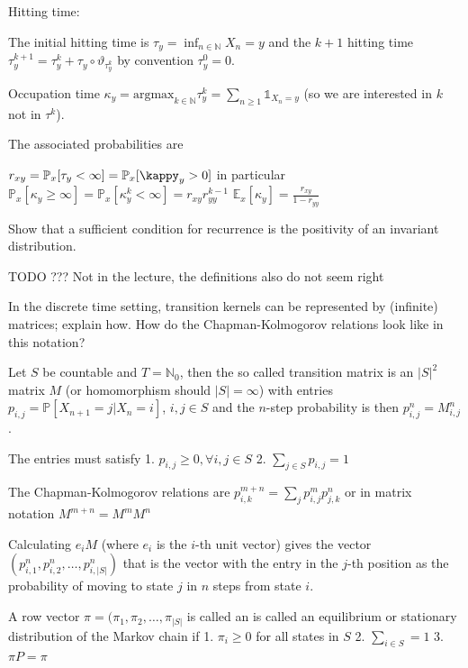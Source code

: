 Hitting time:

The initial hitting time is \( \tau_y = \inf_{n \in \mathbb{N}} X_n = y \)
and the \( k+1 \) hitting time \( \tau^{k+1}_y = \tau^{k}_y + \tau_y \circ \vartheta_{\tau^{k}_y} \)
by convention \( \tau_y^0 = 0 \).

Occupation time
\( \kappa_y = \text{argmax}_{k \in \mathbb{N}} \tau^k_y = \sum_{n\geq 1} \mathbb{1}_{X_n = y} \)
(so we are interested in \( k \) not in \( \tau^k \)).

The associated probabilities are

\( r_{xy} = \mathbb{P}_x[\tau_y < \infty] = \mathbb{P}_x[\kappy_y > 0] \)
in particular
\( \mathbb{P}_x[\kappa_y \geq \infty] = \mathbb{P}_x[\kappa^k_y < \infty] = r_{xy}r_{yy}^{k-1}\)
\( \mathbb{E}_x[\kappa_y] = \frac{r_{xy}}{1 - r_{yy}} \)

Show that a sufficient condition for recurrence is the positivity of an invariant
distribution.

TODO ??? Not in the lecture, the definitions also do not seem right

In the discrete time setting, transition kernels can be represented by (infinite)
matrices; explain how. How do the Chapman-Kolmogorov relations look like in
this notation?

Let \( S \) be countable and \( T = \mathbb{N}_{0} \), then 
the so called transition matrix is an \( |S|^2 \) matrix \( M \) 
(or homomorphism should \( |S| = \infty \))
with entries \( p_{i,j} = \mathbb{P}[X_{n+1} = j|X_n = i] \), \( i, j \in S \)
and the \( n \)-step probability is then \( p^{n}_{i,j} = M^{n}_{i,j} \).

The entries must satisfy
1. \( p_{i,j} \geq 0, \forall i, j \in S\)
2. \( \sum_{j \in S} p_{i,j} = 1\)


The Chapman-Kolmogorov relations are
\( p^{m+n}_{i,k} = \sum_j p_{i,j}^m p_{j,k}^n \)
or in matrix notation \( M^{m+n} = M^{m}M^n \)

Calculating \( e_i M \) (where \( e_i \) is the \( i \)-th unit vector) gives the vector  
\( (p^n_{i,1}, p^n_{i,2}, \dots, p^n_{i,|S|}) \) that is the vector with the entry in the  
\( j \)-th position as the probability of moving to state \( j \) in \( n \) steps from state \( i \).

A row vector \( \pi = (\pi_1, \pi_2, \dots, \pi_{|S|} \) is called an 
is called an equilibrium or stationary distribution of the Markov chain if
1. \( \pi_i \geq 0 \) for all states in \( S \)
2. \( \sum_{i \in S} = 1 \)
3. \( \pi P = \pi \)

